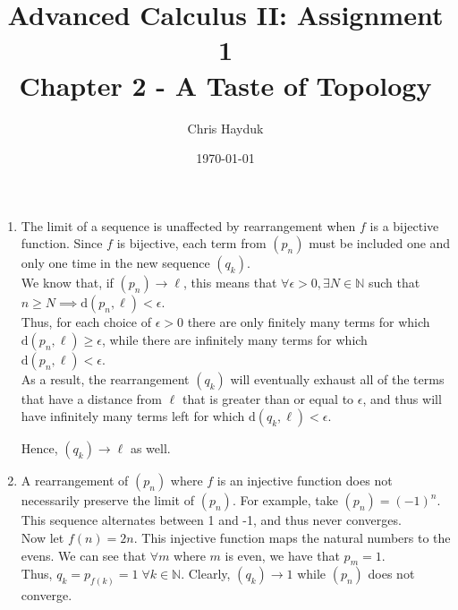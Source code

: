 \documentclass[12pt]{article}
\newenvironment{problem}[2][Problem]{\begin{trivlist}
\item[\hskip \labelsep {\bfseries #1}\hskip \labelsep {\bfseries #2.}]}{\end{trivlist}}
\begin{document}
\title{Advanced Calculus II: Assignment 1\\Chapter 2 - A Taste of Topology}

\author{Chris Hayduk}
\date{\today}

\maketitle

\begin{problem}{12 on p. 126}
\end{problem}

\begin{enumerate}[label=(\alph*)]
	\item The limit of a sequence is unaffected by rearrangement when $f$ is a bijective function. Since $f$ is bijective, each term from $(p_n)$ must be included one and only one time in the new sequence $(q_k)$.\\
	
	We know that, if $(p_n) \to \ell$, this means that $\forall \epsilon > 0, \exists N \in \mathbb{N}$ such that $n \geq N \implies \mathrm{d}(p_n, \ell) < \epsilon$.\\
	
	Thus, for each choice of $\epsilon > 0$ there are only finitely many terms for which $\mathrm{d}(p_n, \ell) \geq \epsilon$, while there are infinitely many terms for which $\mathrm{d}(p_n, \ell) < \epsilon$.\\
	
	As a result, the rearrangement $(q_k)$ will eventually exhaust all of the terms that have a distance from $\ell$ that is greater than or equal to $\epsilon$, and thus will have infinitely many terms left for which $\mathrm{d}(q_k, \ell) < \epsilon$.
	
	Hence, $(q_k) \to \ell$ as well.
	
	\item A rearrangement of $(p_n)$ where $f$ is an injective function does not necessarily preserve the limit of $(p_n)$. For example, take $(p_n) = (-1)^n$. This sequence alternates between 1 and -1, and thus never converges.\\
	
	Now let $f(n) = 2n$. This injective function maps the natural numbers to the evens. We can see that $\forall m$ where $m$ is even, we have that $p_m = 1$.\\
	
	Thus, $q_k = p_{f(k)} = 1 \; \forall k \in \mathbb{N}$. Clearly, $(q_k) \to 1$ while $(p_n)$ does not converge.
	

\end{enumerate}
\end{document}
